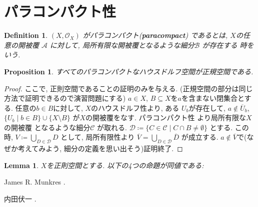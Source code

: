 \documentclass[lualatex]{ltjsbook}
\newcommand{\cl}[1]{\overline{ #1}  }
\newtheorem{lemma}[theorem]{Lemma}
\newtheorem{definition}[theorem]{Definition}
\newtheorem{proposition}[theorem]{Proposition}
\theoremstyle{remark}
\theoremstyle{plain}
\begin{document}
\section{パラコンパクト性}

\begin{definition}
  $\left( X , \mathcal{O}_{X} \right)$ がパラコンパクト(\textbf{paracompact})
  であるとは, $X$の任意の開被覆 $\mathcal{A}$ に対して, 局所有限な開被覆となるような細分$\mathcal{B}$ が存在する
  時をいう.
\end{definition}


\begin{proposition}
  すべてのパラコンパクトなハウスドルフ空間が正規空間である. 
\end{proposition}


\begin{proof}
  ここで, 正則空間であることの証明のみを与える. (正規空間の部分は同じ方法で証明できるので演習問題にする)
  $a \in X$, $B \subseteq X$を$a$を含まない閉集合とする. 任意の$b \in B$に対して, 
  $X$のハウスドルフ性より, ある $U_b$が存在して,  $a \not \in \cl{U}_b$, 
  $\{U_b  \mid b \in B\} \cup \{X \setminus B\}  $ が$X$の開被覆をなす. パラコンパクト性
  より局所有限な$X$の開被覆 となるような細分$\mathcal{C}$ が取れる. 
  $\mathcal{D}\coloneqq \{C \in \mathcal{C} \mid C \cap B \neq \emptyset\} $ 
  とする. この時, $V\coloneqq \bigcup_{D \in \mathcal{D}}D $ として, 局所有限性より
  $\cl{V} = \bigcup_{D \in \mathcal{D}} \cl{D} $ が成立する. 
  $a \not \in \cl{V}$で(なぜか考えてみよう, 細分の定義を思い出そう)証明終了. 

\end{proof}

\begin{lemma}
  $X$を正則空間とする. 以下の4つの命題が同値である:
  
\end{lemma}


\begin{thebibliography}{99}
	 James R. Munkres 
	.

	 内田伏一 
	.
\end{thebibliography}
\end{document}
